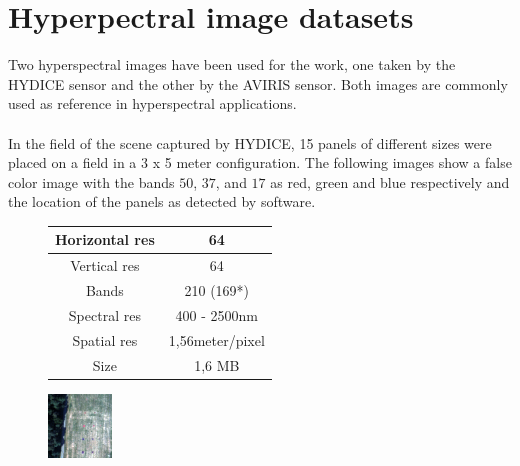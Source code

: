\section{Hyperpectral image datasets}
Two hyperspectral images have been used for the work, one taken by the HYDICE sensor and the other by the AVIRIS sensor. Both images are commonly used as reference in hyperspectral applications. 
\\
\\
In the field of the scene captured by HYDICE, 15 panels of different sizes were placed on a field in a 3 x 5 meter configuration. The following images show a false color image with the bands $50$, $37$, and $17$ as red, green and blue respectively \cite{feng_hyperspectral_2020} and the location of the panels as detected by software.
\begin{figure}[!ht]
\begin{minipage}[t]{2.4in}
\begin{tabular}[b]{c|c}\hline
      Horizontal res & 64 \\ \hline
      Vertical res & 64 \\ \hline
      Bands & 210 (169*)\\ \hline
      Spectral res & 400 - 2500nm \\ \hline
      Spatial res & 1,56meter/pixel \\ \hline
      Size & 1,6 MB\\ \hline
    \end{tabular}
\end{minipage}
\begin{minipage}[t]{0.28\linewidth}
\includegraphics[width=\linewidth]{figures/hydice_bad.png}

\end{minipage}
\end{figure}
